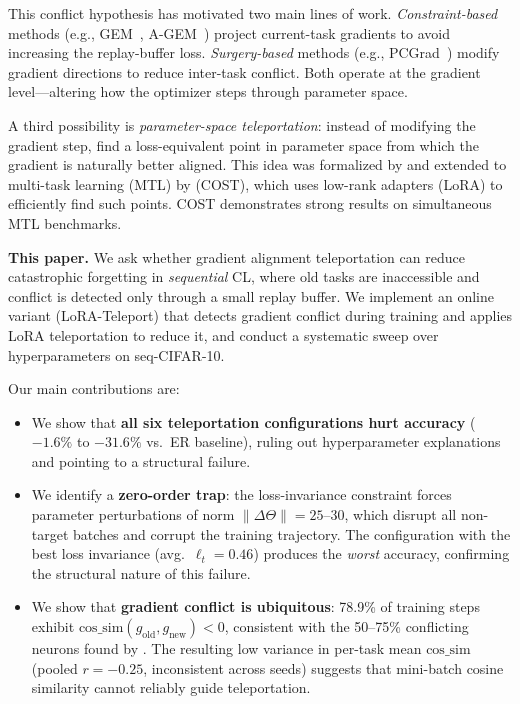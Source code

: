 \documentclass{article}
\newcommand{\method}{LoRA-Teleport}
\newcommand{\eg}{e.g.,\xspace}
\newcommand{\cossim}{\mathrm{cos\_sim}}
\begin{document}
This conflict hypothesis has motivated two main lines of work.
\emph{Constraint-based} methods (\eg GEM~\citep{lopezpaz2017gem}, A-GEM~\citep{chaudhry2019agem})
project current-task gradients to avoid increasing the replay-buffer loss.
\emph{Surgery-based} methods (\eg PCGrad~\citep{yu2020pcgrad}) modify gradient directions
to reduce inter-task conflict.
Both operate at the gradient level---altering how the optimizer steps through parameter space.

A third possibility is \emph{parameter-space teleportation}: instead of modifying the gradient step,
find a loss-equivalent point in parameter space from which the gradient is naturally better aligned.
This idea was formalized by \citet{zhao2022teleport} and extended to multi-task learning (MTL) by
\citet{zhou2025cost} (COST), which uses low-rank adapters (LoRA) to efficiently find such points.
COST demonstrates strong results on simultaneous MTL benchmarks.

\textbf{This paper.}
We ask whether gradient alignment teleportation can reduce catastrophic forgetting in
\emph{sequential} CL, where old tasks are inaccessible and conflict is detected only
through a small replay buffer.
We implement an online variant (\method) that detects gradient conflict during training
and applies LoRA teleportation to reduce it, and conduct a systematic sweep over
hyperparameters on seq-CIFAR-10.

Our main contributions are:
\begin{itemize}
  \item We show that \textbf{all six teleportation configurations hurt accuracy}
        ($-1.6\%$ to $-31.6\%$ vs.\ ER baseline), ruling out hyperparameter explanations
        and pointing to a structural failure.
  \item We identify a \textbf{zero-order trap}: the loss-invariance constraint forces
        parameter perturbations of norm $\|\Delta\Theta\| = 25$--$30$, which disrupt all
        non-target batches and corrupt the training trajectory.
        The configuration with the best loss invariance (avg.\ $\ell_t = 0.46$) produces
        the \emph{worst} accuracy, confirming the structural nature of this failure.
  \item We show that \textbf{gradient conflict is ubiquitous}: 78.9\% of training steps
        exhibit $\cossim(g_\mathrm{old}, g_\mathrm{new}) < 0$,
        consistent with the 50--75\% conflicting neurons found by \citet{liu2026gradconflict}.
        The resulting low variance in per-task mean $\cossim$ (pooled $r = -0.25$, inconsistent
        across seeds) suggests that mini-batch cosine similarity cannot reliably guide teleportation.
\end{itemize}
\end{document}
